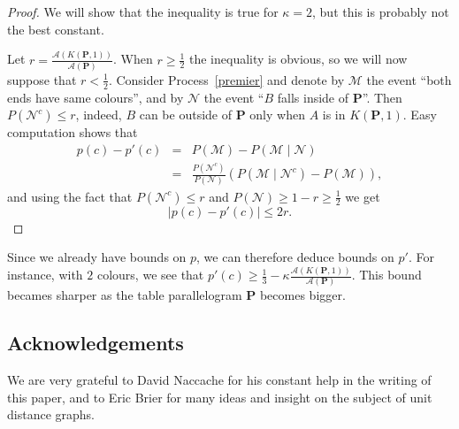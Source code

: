 \documentclass[a4paper,11pt]{article}
\theoremstyle{definition}
\theoremstyle{remark}
\begin{document}
\begin{proof}
We will show that the inequality is true for $\kappa =2$, but this is probably 
not the best constant.

Let $r = \frac{\mathcal{A}(K(\mathbf{P},1))}{\mathcal{A}(\mathbf{P})}$. When 
$r \geq \frac12$ the inequality is obvious, so we will now suppose that 
$r < \frac12$. Consider Process~\ref{premier} and denote by $\mathcal{M}$ the 
event ``both ends have same colours'', and by $\mathcal{N}$ the event ``$B$ 
falls inside of $\mathbf{P}$''. Then $P(\mathcal{N}^c) \leq r$, indeed, $B$ can 
be outside of $\mathbf{P}$ only
when $A$ is in $K(\mathbf{P},1)$. Easy computation shows that
\begin{eqnarray*}
p(c) - p'(c) & = & P(\mathcal{M}) - P(\mathcal{M} \mid \mathcal{N}) \\
& = & \frac{P(\mathcal{N}^c)}{P(\mathcal{N})} \left( P(\mathcal{M}\mid \mathcal{N}^c) - P(\mathcal{M})\right),
\end{eqnarray*}
and using the fact that $P(\mathcal{N}^c) \leq r$ and 
$P(\mathcal{N}) \geq 1-r \geq \frac12$ we get 
$$ |p(c) - p'(c)| \leq 2r.$$
\end{proof}

Since we already have bounds on $p$, we can therefore deduce bounds on $p'$.
For instance, with $2$ colours, we see that 
$p'(c) \geq \frac13 - \kappa \frac{\mathcal{A}(K(\mathbf{P},1))}{\mathcal{A}(\mathbf{P})}$. 
This bound becames sharper as the table parallelogram $\mathbf{P}$ becomes bigger.


\subsection*{Acknowledgements}
We are very grateful to David Naccache for his constant help in the writing of
this paper, and to Eric Brier for many ideas and insight on the subject of 
unit distance graphs.



\end{document}
